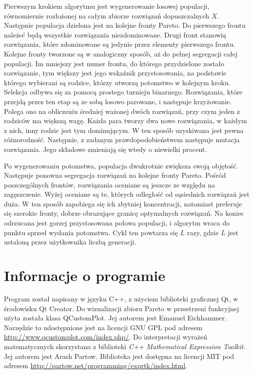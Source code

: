 \documentclass[11pt,a4paper]{article}
\begin{document}
Pierwszym krokiem algorytmu jest wygenerowanie losowej populacji, równomiernie rozłożonej na całym zbiorze rozwiązań dopuszczalnych \(X\). Następnie populacja dzielona jest na kolejne fronty Pareto. Do pierwszego frontu należeć będą wszystkie rozwiązania niezdominowane. Drugi front stanowią rozwiązania, które zdominowane są jedynie przez elementy pierwszego frontu. Kolejne fronty tworzone są w analogiczny sposób, aż do pełnej segregacji całej populacji. Im mniejszy jest numer frontu, do którego przydzielone zostało rozwiązanie, tym większy jest jego wskaźnik przystosowania, na podstawie którego wybierani są rodzice, którzy utworzą potomstwo w kolejnym kroku. Selekcja odbywa się za pomocą prostego turnieju binarnego. Rozwiązania, które przejdą przez ten etap są ze sobą losowo parowane, i następuje krzyżowanie. Polega ono na obliczeniu średniej ważonej dwóch rozwiązań, przy czym jeden z rodziców ma większą wagę. Każda para tworzy dwa nowe rozwiązania, w każdym z nich, inny rodzic jest tym dominującym. W ten sposób uzyskiwana jest pewna różnorodność. Następnie, z zadanym prawdopodobieństwem następuje mutacja rozwiązania. Jego składowe zmieniają się wtedy o niewielki procent. 

Po wygenerowaniu potomstwa, populacja dwukrotnie zwiększa swoją objętość. Następuje ponowna segregacja rozwiązań na kolejne fronty Pareto. Pośród poszczególnych frontów, rozwiązania oceniane są jeszcze ze względu na zagęszczenie. Wyżej oceniane są te, których odległość od sąsiednich rozwiązań jest duża. W ten sposób zapobiega się ich zbytniej koncentracji, natomiast preferuje się szerokie fronty, dobrze obrazujące granicę optymalnych rozwiązań. Na koniec odrzucana jest gorzej przystosowana połowa populacji, i algorytm wraca do punktu sprzed wydania potomstwa. Cykl ten powtarza się \(L\) razy, gdzie \(L\) jest ustaloną przez użytkownika liczbą generacji.

\section{Informacje o programie}
Program został napisany w języku C++, z użyciem biblioteki graficznej Qt, w środowisku Qt Creator. Do wizualizacji zbioru Pareto w przestrzeni funkcyjnej użyta została klasa QCustomPlot. Jej autorem jest Emanuel Eichhammer. Narzędzie to udostępnione jest na licencji GNU GPL pod adresem \url{http://www.qcustomplot.com/index.php/}. Do interpretacji wyrażeń matematycznych skorzystano z biblioteki \textit{C++ Mathematical Expression Toolkit}. Jej autorem jest Arash Partow. Biblioteka jest dostępna na licencji MIT pod adresem 
\url{http://partow.net/programming/exprtk/index.html}. 
\end{document}
